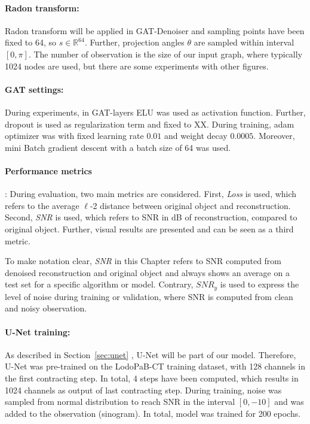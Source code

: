\paragraph{Radon transform:}
Radon transform will be applied in GAT-Denoiser and sampling points have been fixed to 64, so $s \in \mathbb{R}^64$.
Further, projection angles $\theta$ are sampled within interval $[0, \pi]$.
The number of observation is the size of our input graph, where typically 1024 nodes are used, but 
there are some experiments with other figures.


\paragraph{GAT settings:}
During experiments, in GAT-layers ELU was used as activation function.
Further, dropout is used as regularization term and fixed to XX.
During training, adam optimizer was with fixed learning rate $0.01$ and weight decay $0.0005$.
Moreover, mini Batch gradient descent with a batch size of 64 was used.

\paragraph{Performance metrics}:
During evaluation, two main metrics are considered.
First, \textit{Loss} is used, which refers to the average $\ell$-2 distance between original object and reconstruction.
Second, \textit{SNR} is used, which refers to SNR in dB of reconstruction, compared to original object.
Further, visual results are presented and can be seen as a third metric.

To make notation clear, \textit{SNR} in this Chapter refers to SNR computed from denoised reconstruction and original object 
and always shows an average on a test set for a specific algorithm or model.
Contrary, $\textit{SNR}_y$ is used to express the level of noise during training or validation, 
where SNR is computed from clean and noisy observation.

\paragraph{U-Net training:}
As described in Section~\ref{sec:unet} \textit{}, U-Net will be part of our model.
Therefore, U-Net was pre-trained on the LodoPaB-CT training dataset, with 128 channels in the first contracting step. 
In total, 4 steps have been computed, which results in 1024 channels as output of last contracting step.
During training, noise was sampled from normal distribution to reach SNR in the interval $[0, -10]$ and was added to the observation (sinogram). 
In total, model was trained for 200 epochs.

